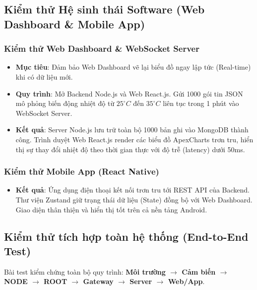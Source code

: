 \documentclass{article} %
\begin{document}
\subsection{Kiểm thử Hệ sinh thái Software (Web Dashboard \& Mobile App)}

\subsubsection{Kiểm thử Web Dashboard \& WebSocket Server}
\begin{itemize}
    \item \textbf{Mục tiêu}: Đảm bảo Web Dashboard vẽ lại biểu đồ ngay lập tức (Real-time) khi có dữ liệu mới.
    \item \textbf{Quy trình}: Mở Backend Node.js và Web React.js. Gửi 1000 gói tin JSON mô phỏng biến động nhiệt độ từ $25^\circ C$ đến $35^\circ C$ liên tục trong 1 phút vào WebSocket Server.
    \item \textbf{Kết quả}: Server Node.js lưu trữ toàn bộ 1000 bản ghi vào MongoDB thành công. Trình duyệt Web React.js render các biểu đồ ApexCharts trơn tru, hiển thị sự thay đổi nhiệt độ theo thời gian thực với độ trễ (latency) dưới 50ms.
\end{itemize}

\subsubsection{Kiểm thử Mobile App (React Native)}
\begin{itemize}
    \item \textbf{Kết quả}: Ứng dụng điện thoại kết nối trơn tru tới REST API của Backend. Thư viện Zustand giữ trạng thái dữ liệu (State) đồng bộ với Web Dashboard. Giao diện thân thiện và hiển thị tốt trên cả nền tảng Android.
\end{itemize}

\subsection{Kiểm thử tích hợp toàn hệ thống (End-to-End Test)}

Bài test kiểm chứng toàn bộ quy trình: \textbf{Môi trường $\rightarrow$ Cảm biến $\rightarrow$ NODE $\rightarrow$ ROOT $\rightarrow$ Gateway $\rightarrow$ Server $\rightarrow$ Web/App}.
\end{document}

